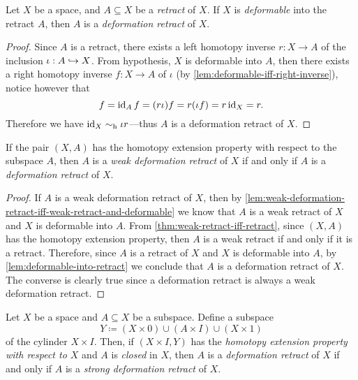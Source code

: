 \begin{lemma}
\label{lem:deformable-into-retract}
Let \(X\) be a space, and \(A \subseteq X\) be a \emph{retract} of \(X\). If
\(X\) is \emph{deformable} into the retract \(A\), then \(A\) is a
\emph{deformation retract} of \(X\).
\end{lemma}

\begin{proof}
Since \(A\) is a retract, there exists a left homotopy inverse \(r: X \to A\)
of the inclusion \(\iota: A \hookrightarrow X\). From hypothesis, \(X\) is deformable into
\(A\), then there exists a right homotopy inverse \(f: X \to A\) of \(\iota\)
(by \cref{lem:deformable-iff-right-inverse}), notice however that
\[
f = \operatorname{id}_A f = (r \iota) f = r (\iota f) = r \operatorname{id}_X = r.
\]
Therefore we have \(\operatorname{id}_X \sim_{\text{h}} \iota r\)---thus \(A\) is a deformation retract
of \(X\).
\end{proof}

\begin{corollary}
\label{cor:htpy-extension-prop-weak-iff-deformation}
If the pair \((X, A)\) has the homotopy extension property with respect to the
subspace \(A\), then \(A\) is a \emph{weak deformation retract} of \(X\) if and
only if \(A\) is a \emph{deformation retract} of \(X\).
\end{corollary}

\begin{proof}
If \(A\) is a weak deformation retract of \(X\), then by
\cref{lem:weak-deformation-retract-iff-weak-retract-and-deformable} we know that
\(A\) is a weak retract of \(X\) and \(X\) is deformable into \(A\). From
\cref{thm:weak-retract-iff-retract}, since \((X, A)\) has the homotopy extension
property, then \(A\) is a weak retract if and only if it is a
retract. Therefore, since \(A\) is a retract of \(X\) and \(X\) is deformable
into \(A\), by \cref{lem:deformable-into-retract} we conclude that \(A\) is a
deformation retract of \(X\). The converse is clearly true since a deformation
retract is always a weak deformation retract.
\end{proof}

\begin{theorem}
\label{thm:deformation-retract-iff-strong-deformation-retract}
Let \(X\) be a space and \(A \subseteq X\) be a subspace. Define a subspace
\[
Y \coloneq (X \times 0) \cup (A \times I) \cup (X \times 1)
\]
of the cylinder \(X \times I\). Then, if \((X \times I, Y)\) has the
\emph{homotopy extension property with respect to \(X\)} and \(A\) is
\emph{closed} in \(X\), then \(A\) is a \emph{deformation retract} of \(X\) if
and only if \(A\) is a \emph{strong deformation retract} of \(X\).
\end{theorem}

